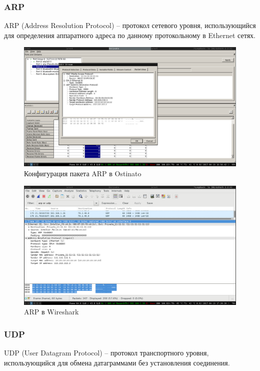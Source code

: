 \documentclass[12pt, a4paper] {ncc}
\begin{document}
\subsubsection*{ARP}
	ARP (Address Resolution Protocol) -- протокол сетевого уровня, использующийся для определения аппаратного адреса 
по данному протокольному в Ethernet сетях. 

	\begin{figure}[h!]
		\includegraphics[scale=0.5]{ARPStream_without_frag.png}
		\caption{Конфигурация пакета ARP в Ostinato}
		\center
	\end{figure}

	\begin{figure}[h!]
		\includegraphics[scale=0.4]{./CapturedARP.png}
		\caption{ARP в Wireshark}
		\center
	\end{figure}

\subsubsection*{UDP}
	UDP (User Datagram Protocol) -- протокол транспортного уровня, использующийся для обмена датаграммами
без установления соединения.
\end{document}
